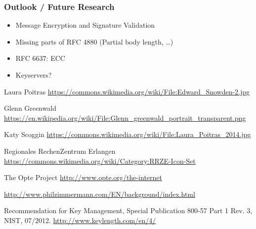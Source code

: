\documentclass{beamer}
\begin{document}

\begin{frame}
	\frametitle{Outlook / Future Research}
	
	\begin{itemize}
		\item Message Encryption and Signature Validation
		\item Missing parts of RFC 4880 (Partial body length, \ldots)
		\item RFC 6637: ECC
		\item Keyservers?
	\end{itemize}
	
	
\end{frame}



  
\begin{frame}

\begin{thebibliography}{1}
\scriptsize

	 Laura Poitras \url{https://commons.wikimedia.org/wiki/File:Edward_Snowden-2.jpg} 
	
	 Glenn Greenwald  \url{https://en.wikipedia.org/wiki/File:Glenn_greenwald_portrait_transparent.png}
	
	 Katy Scoggin \url{https://commons.wikimedia.org/wiki/File:Laura_Poitras_2014.jpg}
	
	 Regionales RechenZentrum Erlangen  \url{https://commons.wikimedia.org/wiki/Category:RRZE-Icon-Set}
	
	  The Opte Project \url{http://www.opte.org/the-internet}
	
	 \url{http://www.philzimmermann.com/EN/background/index.html}
	
	 Recommendation for Key Management, Special Publication 800-57 Part 1 Rev. 3, NIST, 07/2012. \url{http://www.keylength.com/en/4/}

\end{thebibliography}
\end{frame}
\end{document}
